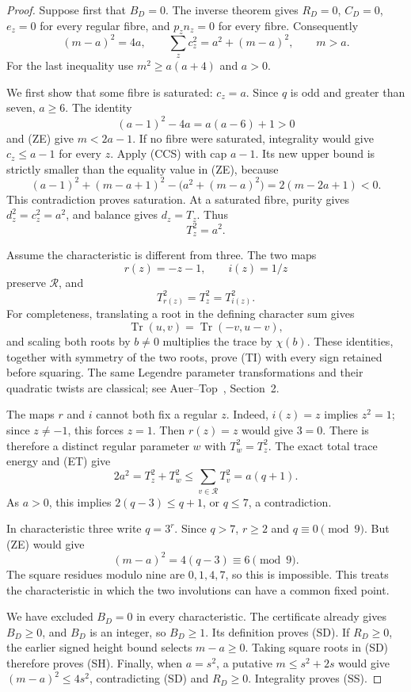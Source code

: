 \documentclass[11pt]{article}
\begin{document}
\begin{proof}
Suppose first that \(B_D=0\). The inverse theorem gives
\(R_D=0\), \(C_D=0\), \(e_z=0\) for every regular fibre,
and \(p_zn_z=0\) for every fibre. Consequently
\[
 (m-a)^2=4a,\qquad
 \sum_z c_z^2=a^2+(m-a)^2,\qquad m>a. \tag{ZE}
\]
For the last inequality use \(m^2\ge a(a+4)\) and \(a>0\).

We first show that some fibre is saturated: \(c_z=a\).
Since \(q\) is odd and greater than seven, \(a\ge6\).
The identity
\[
 (a-1)^2-4a=a(a-6)+1>0
\]
and (ZE) give \(m<2a-1\). If no fibre were saturated,
integrality would give \(c_z\le a-1\) for every \(z\).
Apply (CCS) with cap \(a-1\). Its new upper bound is strictly
smaller than the equality value in (ZE), because
\[
 (a-1)^2+(m-a+1)^2-\bigl(a^2+(m-a)^2\bigr)
                   =2(m-2a+1)<0.
\]
This contradiction proves saturation. At a saturated fibre,
purity gives \(d_z^2=c_z^2=a^2\), and balance gives \(d_z=T_z\).
Thus
\[
                            T_z^2=a^2. \tag{ET}
\]

Assume the characteristic is different from three.
The two maps
\[
 r(z)=-z-1,\qquad i(z)=1/z
\]
preserve \(\mathcal R\), and
\[
                        T_{r(z)}^2=T_z^2=T_{i(z)}^2. \tag{TI}
\]
For completeness, translating a root in the defining character
sum gives
\[
 \operatorname{Tr}(u,v)=\operatorname{Tr}(-v,u-v),
\]
and scaling both roots by \(b\ne0\) multiplies the trace by
\(\chi(b)\). These identities, together with symmetry of the two
roots, prove (TI) with every sign retained before squaring.
The same Legendre parameter transformations and their quadratic
twists are classical; see Auer--Top~\cite{AuerTopLegendre}, Section~2.

The maps \(r\) and \(i\) cannot both fix a regular \(z\).
Indeed, \(i(z)=z\) implies \(z^2=1\); since \(z\ne-1\), this
forces \(z=1\). Then \(r(z)=z\) would give \(3=0\).
There is therefore a distinct regular parameter \(w\) with
\(T_w^2=T_z^2\). The exact total trace energy and (ET) give
\[
 2a^2=T_z^2+T_w^2\le\sum_{v\in\mathcal R}T_v^2=a(q+1).
\]
As \(a>0\), this implies \(2(q-3)\le q+1\), or \(q\le7\),
a contradiction.

In characteristic three write \(q=3^r\). Since \(q>7\),
\(r\ge2\) and \(q\equiv0\pmod9\). But (ZE) would give
\[
                         (m-a)^2=4(q-3)\equiv6\pmod9.
\]
The square residues modulo nine are \(0,1,4,7\), so this is
impossible. This treats the characteristic in which the two
involutions can have a common fixed point.

We have excluded \(B_D=0\) in every characteristic.
The certificate already gives \(B_D\ge0\), and \(B_D\) is an
integer, so \(B_D\ge1\). Its definition proves (SD).
If \(R_D\ge0\), the earlier signed height bound selects
\(m-a\ge0\). Taking square roots in (SD) therefore proves (SH).
Finally, when \(a=s^2\), a putative \(m\le s^2+2s\) would give
\((m-a)^2\le4s^2\), contradicting (SD) and \(R_D\ge0\).
Integrality proves (SS).
\end{proof}
\end{document}
